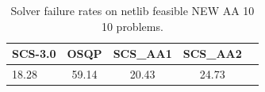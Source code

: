 \begin{table}
\centering
\caption{Solver failure rates on netlib feasible NEW AA 10 10 problems.}
\label{t-netlib feasible NEW AA 10 10-failure}
\begin{tabular}{lcccc}
\toprule
 SCS-3.0 &  OSQP &  SCS\_AA1 &  SCS\_AA2 \\
\midrule
   18.28 & 59.14 &    20.43 &    24.73 \\
\bottomrule
\end{tabular}
\end{table}
